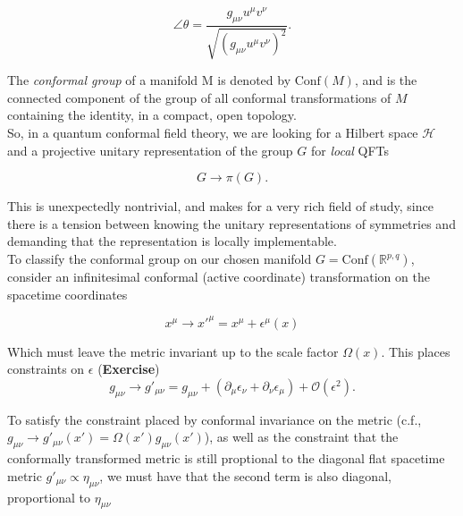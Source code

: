 \begin{equation}
\angle \theta = \frac{g_{\mu\nu} u^\mu v^\nu}{\sqrt{(g_{\mu\nu} u^\mu v^\nu)^2}}.
\end{equation}

\noindent The \textit{conformal group} of a manifold M is denoted by $\text{Conf}(M)$, and is the connected component of the group of all conformal transformations of $M$ containing the identity, in a compact, open topology. \\

\noindent So, in a quantum conformal field theory, we are looking for a Hilbert space $\mathcal{H}$ and a projective unitary representation of the group $G$ for \textit{local} QFTs

\begin{equation}
G \rightarrow \pi (G).
\end{equation}

\noindent This is unexpectedly nontrivial, and makes for a very rich field of study, since there is a tension between knowing the unitary representations of symmetries and demanding that the representation is locally implementable. \\

\noindent To classify the conformal group on our chosen manifold $G = \text{Conf} (\mathbb{R}^{p,q})$, consider an infinitesimal conformal (active coordinate) transformation on the spacetime coordinates

\begin{equation}
x^\mu \rightarrow x'^\mu = x^\mu +  \epsilon^\mu (x)
\end{equation}

\noindent Which must leave the metric invariant up to the scale factor $\Omega(x)$. This places constraints on $\epsilon$ (\textbf{Exercise}) \\

\begin{equation}
g_{\mu\nu} \rightarrow g'_{\mu\nu} = g_{\mu\nu} + (\partial_\mu \epsilon_\nu + \partial_\nu \epsilon_\mu) + \mathcal{O} (\epsilon^2).
\end{equation}

\noindent To satisfy the constraint placed by conformal invariance on the metric (c.f., $g_{\mu\nu} \rightarrow g'_{\mu\nu} (x') = \Omega(x') g_{\mu\nu} (x')$), as well as the constraint that the conformally transformed metric is still proptional to the diagonal flat spacetime metric $g'_{\mu\nu} \propto \eta_{\mu\nu}$, we must have that the second term is also diagonal, proportional to $\eta_{\mu\nu}$

